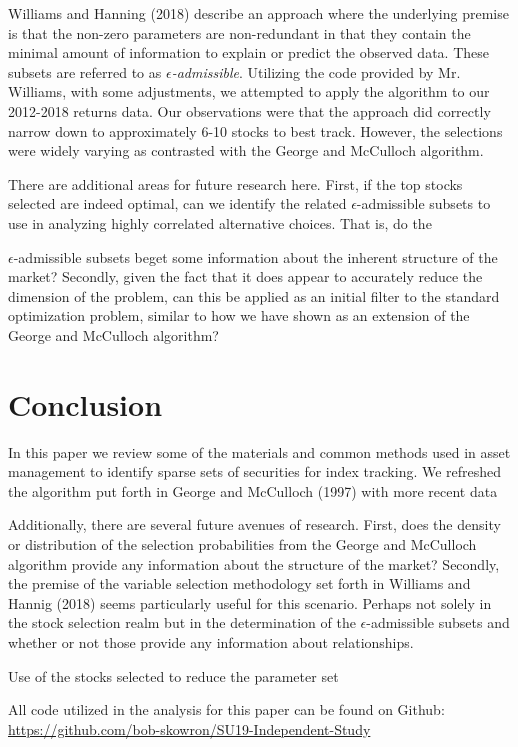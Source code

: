 \documentclass[a4paper, 12pt]{article}
\theoremstyle{plain}
\theoremstyle{definition}
\theoremstyle{remark}
\begin{document}
Williams and Hanning (2018) describe an approach where the underlying premise is that the non-zero parameters are non-redundant in that they contain the minimal amount of information to explain or predict the observed data. These subsets are referred to as \textit{$\epsilon$-admissible}. Utilizing the code provided by Mr. Williams, with some adjustments, we attempted to apply the algorithm to our 2012-2018 returns data. Our observations were that the approach did correctly narrow down to approximately 6-10 stocks to best track. However, the selections were widely varying as contrasted with the George and McCulloch algorithm.

There are additional areas for future research here. First, if the top stocks selected are indeed optimal, can we identify the related $\epsilon$-admissible subsets to use in analyzing highly correlated alternative choices. That is, do the {$\epsilon$-admissible subsets beget some information about the inherent structure of the market? Secondly, given the fact that it does appear to accurately reduce the dimension of the problem, can this be applied as an initial filter to the standard optimization problem, similar to how we have shown as an extension of the George and McCulloch algorithm?

\section{Conclusion}

In this paper we review some of the materials and common methods used in asset management to identify sparse sets of securities for index tracking. We refreshed the algorithm put forth in George and McCulloch (1997) with more recent data 

Additionally, there are several future avenues of research. First, does the density or distribution of the selection probabilities from the George and McCulloch algorithm provide any information about the structure of the market? Secondly, the premise of the variable selection methodology set forth in Williams and Hannig (2018) seems particularly useful for this scenario. Perhaps not solely in the stock selection realm but in the determination of the $\epsilon$-admissible subsets and whether or not those provide any information about relationships. 

Use of the stocks selected to reduce the parameter set

All code utilized in the analysis for this paper can be found on Github: \href{https://github.com/bob-skowron/SU19-Independent-Study}{https://github.com/bob-skowron/SU19-Independent-Study}

}
\end{document}

